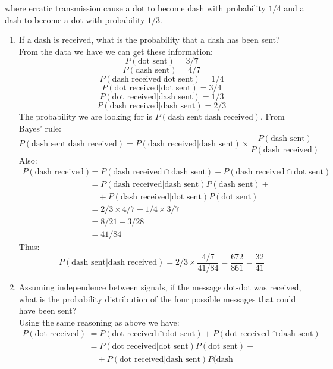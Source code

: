 \documentclass[a4paper]{article}
\begin{document}
\begin{enumerate}
  where erratic transmission cause a dot to become dash with probability $1/4$
  and a dash to become a dot with probability $1/3$.
    \begin{enumerate}
      \item If a dash is received, what is the probability that a dash has been
      sent?\\
      From the data we have we can get these information:
      $$P(\text{dot sent})=3/7$$
      $$P(\text{dash sent})=4/7$$
      $$P(\text{dash received}|\text{dot sent})=1/4$$
      $$P(\text{dot received}|\text{dot sent})=3/4$$
      $$P(\text{dot received}|\text{dash sent})=1/3$$
      $$P(\text{dash received}|\text{dash sent})=2/3$$
      The probability we are looking for is $P(\text{dash sent}|\text{dash
      received})$. From Bayes' rule:
      $$P(\text{dash sent}|\text{dash received})=P(\text{dash
      received}|\text{dash sent})\times\frac{P(\text{dash
      sent})}{P(\text{dash received})}$$
      Also:
      \begin{align}
      P(\text{dash received})&=P(\text{dash received}\cap\text{dash
      sent})+P(\text{dash received}\cap\text{dot sent})\nonumber\\
      &=P(\text{dash received}|\text{dash sent})P(\text{dash sent})+\nonumber\\
      &\quad+P(\text{dash received}|\text{dot sent})P(\text{dot sent})\nonumber\\
      &=2/3\times4/7+1/4\times3/7\nonumber\\
      &=8/21+3/28\nonumber\\
      &=41/84
      \end{align}
      Thus:
      $$P(\text{dash sent}|\text{dash
      received})=2/3\times\frac{4/7}{41/84}=\frac{672}{861}=\frac{32}{41}$$
      \item Assuming independence between signals, if the message dot-dot was
      received, what is the probability distribution of the four possible
      messages that could have been sent?\\
      Using the same reasoning as above we have:\\
      \begin{align}
      P(\text{dot received})&=P(\text{dot received}\cap\text{dot
      sent})+P(\text{dot received}\cap\text{dash sent})\nonumber\\
      &=P(\text{dot received}|\text{dot sent})P(\text{dot sent})+\nonumber\\
      &\quad+P(\text{dot received}|\text{dash sent})P(\text{dash
}
\end{align}
\end{enumerate}
\end{enumerate}
\end{document}
